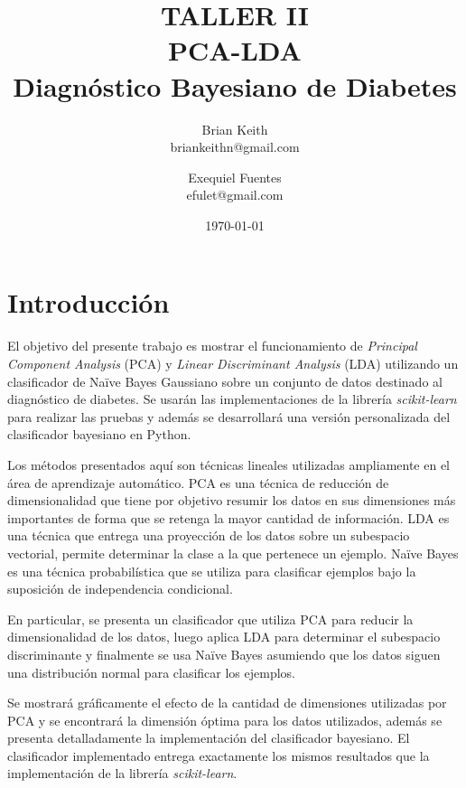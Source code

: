 \documentclass[letter, titlepage, 10pt]{article}
\title{TALLER II \\ PCA-LDA \\ Diagnóstico Bayesiano de Diabetes} %
\author{Brian Keith\\
  \small briankeithn@gmail.com\\
\and
  Exequiel Fuentes\\
  \small efulet@gmail.com\\
}
\date{\today}
\begin{document}
\maketitle %



\section{Introducción}
El objetivo del presente trabajo es mostrar el funcionamiento de \textit{Principal Component Analysis} (PCA) y \textit{Linear Discriminant Analysis} (LDA) utilizando un clasificador de Naïve Bayes Gaussiano sobre un conjunto de datos destinado al diagnóstico de diabetes. Se usarán las implementaciones de la librería \textit{scikit-learn} para realizar las pruebas y además se desarrollará una versión personalizada del clasificador bayesiano en Python.

Los métodos presentados aquí son técnicas lineales utilizadas ampliamente en el área de aprendizaje automático. PCA es una técnica de reducción de dimensionalidad que tiene por objetivo resumir los datos en sus dimensiones más importantes de forma que se retenga la mayor cantidad de información. LDA es una técnica que entrega una proyección de los datos sobre un subespacio vectorial, permite determinar la clase a la que pertenece un ejemplo. Naïve Bayes es una técnica probabilística que se utiliza para clasificar ejemplos bajo la suposición de independencia condicional.

En particular, se presenta un clasificador que utiliza PCA para reducir la dimensionalidad de los datos, luego aplica LDA para determinar el subespacio discriminante y finalmente se usa Naïve Bayes asumiendo que los datos siguen una distribución normal para clasificar los ejemplos.

Se mostrará gráficamente el efecto de la cantidad de dimensiones utilizadas por PCA y se encontrará la dimensión óptima para los datos utilizados, además se presenta detalladamente la implementación del clasificador bayesiano. El clasificador implementado entrega exactamente los mismos resultados que la implementación de la librería \textit{scikit-learn}.
\end{document}
